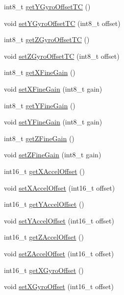 \begin{DoxyCompactItemize}
\item 
int8\+\_\+t \hyperlink{classMPU6050_aeec244d6f9d33f45260ff459fabb9622}{get\+Y\+Gyro\+Offset\+TC} ()
\item 
void \hyperlink{classMPU6050_a5a671929be9a7d6ff5e433aa0eaa0c90}{set\+Y\+Gyro\+Offset\+TC} (int8\+\_\+t offset)
\item 
int8\+\_\+t \hyperlink{classMPU6050_afb9254a04feb7909cb808e94fa4fc44c}{get\+Z\+Gyro\+Offset\+TC} ()
\item 
void \hyperlink{classMPU6050_a1d9fc7f1058c4ab9a8a586e3fc30d12d}{set\+Z\+Gyro\+Offset\+TC} (int8\+\_\+t offset)
\item 
int8\+\_\+t \hyperlink{classMPU6050_a9c9332a5050be54fa47f321be01d524b}{get\+X\+Fine\+Gain} ()
\item 
void \hyperlink{classMPU6050_a73d4473d134cf5f7c516ff38faa2b4a8}{set\+X\+Fine\+Gain} (int8\+\_\+t gain)
\item 
int8\+\_\+t \hyperlink{classMPU6050_ad471fd5499dd2fbf730c066a8893420d}{get\+Y\+Fine\+Gain} ()
\item 
void \hyperlink{classMPU6050_a7f97e86dcfa1d491d8f809112c6fb40b}{set\+Y\+Fine\+Gain} (int8\+\_\+t gain)
\item 
int8\+\_\+t \hyperlink{classMPU6050_a13c980e62e6e7774299fea1c827b6e7a}{get\+Z\+Fine\+Gain} ()
\item 
void \hyperlink{classMPU6050_a98107dec68994cfc8c8cb1d0d78d2b6b}{set\+Z\+Fine\+Gain} (int8\+\_\+t gain)
\item 
int16\+\_\+t \hyperlink{classMPU6050_afdfe715ced419d117c2c47007d631f9e}{get\+X\+Accel\+Offset} ()
\item 
void \hyperlink{classMPU6050_a447144e025f55b1dc96d7c209c5defd6}{set\+X\+Accel\+Offset} (int16\+\_\+t offset)
\item 
int16\+\_\+t \hyperlink{classMPU6050_a7753d3c3f5d9e341f1ed0712079a0d12}{get\+Y\+Accel\+Offset} ()
\item 
void \hyperlink{classMPU6050_a6214fa36c8881f3b02a3e7033678bfb3}{set\+Y\+Accel\+Offset} (int16\+\_\+t offset)
\item 
int16\+\_\+t \hyperlink{classMPU6050_ac9a45355c735a09501b6a58c92fb752c}{get\+Z\+Accel\+Offset} ()
\item 
void \hyperlink{classMPU6050_a4d1868b660d695eae912ef73407e21e8}{set\+Z\+Accel\+Offset} (int16\+\_\+t offset)
\item 
int16\+\_\+t \hyperlink{classMPU6050_a4c1b9f42f59b11936da86b2a1b099981}{get\+X\+Gyro\+Offset} ()
\item 
void \hyperlink{classMPU6050_a7097c12d38a23fb0a286460619998470}{set\+X\+Gyro\+Offset} (int16\+\_\+t offset)

\end{DoxyCompactItemize}
